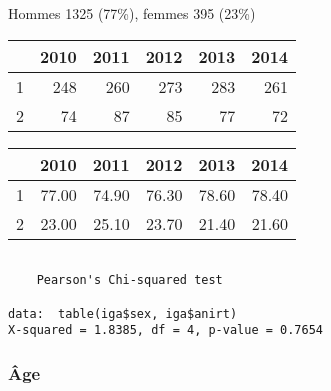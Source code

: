 \documentclass[11pt,a4paper]{article}\usepackage[]{graphicx}\usepackage[]{color}
\makeatletter
\newenvironment{kframe}{%
 \def\at@end@of@kframe{}%
 \ifinner\ifhmode%
  \def\at@end@of@kframe{\end{minipage}}%
  \begin{minipage}{\columnwidth}%
 \fi\fi%
 \def\FrameCommand##1{\hskip\@totalleftmargin \hskip-\fboxsep
 \colorbox{shadecolor}{##1}\hskip-\fboxsep
     \hskip-\linewidth \hskip-\@totalleftmargin \hskip\columnwidth}%
 \MakeFramed {\advance\hsize-\width
   \@totalleftmargin\z@ \linewidth\hsize
   \@setminipage}}%
 {\par\unskip\endMakeFramed%
 \at@end@of@kframe}
\newenvironment{knitrout}{}{} %
\makeatother
\begin{document}
Hommes 1325 (77\%), femmes 395 (23\%)
\begin{table}[ht]
\centering
\begin{tabular}{rrrrrr}
  \hline
 & 2010 & 2011 & 2012 & 2013 & 2014 \\ 
  \hline
1 & 248 & 260 & 273 & 283 & 261 \\ 
  2 &  74 &  87 &  85 &  77 &  72 \\ 
   \hline
\end{tabular}
\end{table}
\begin{table}[ht]
\centering
\begin{tabular}{rrrrrr}
  \hline
 & 2010 & 2011 & 2012 & 2013 & 2014 \\ 
  \hline
1 & 77.00 & 74.90 & 76.30 & 78.60 & 78.40 \\ 
  2 & 23.00 & 25.10 & 23.70 & 21.40 & 21.60 \\ 
   \hline
\end{tabular}
\end{table}


\begin{knitrout}
\color{fgcolor}\begin{kframe}
\begin{verbatim}

	Pearson's Chi-squared test

data:  table(iga$sex, iga$anirt)
X-squared = 1.8385, df = 4, p-value = 0.7654
\end{verbatim}
\end{kframe}
\end{knitrout}

\subsubsection*{Âge}
\end{document}

